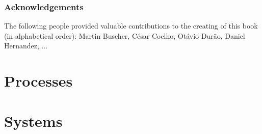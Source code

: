 \documentclass[11pt,fleqn]{book} %
\begin{document}
\section*{Acknowledgements}

The following people provided valuable contributions to the creating of this book (in alphabetical order):
Martin Buscher, César Coelho, Otávio Durão, Daniel Hernandez, ...





\pagestyle{empty} %

\tableofcontents %

\clearpage %

\pagestyle{fancy} %


\setlength{\parskip}{0.6em}
\setlength{\parindent}{0pt}



\part{Processes}
\label{part:processes}









\part{Systems}
\end{document}
